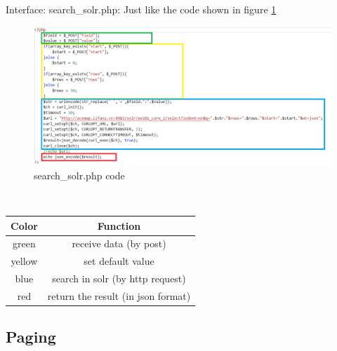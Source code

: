 \documentclass{article}
\begin{document}
	Interface: search\_solr.php: Just like the code shown in figure \ref{searchsolr}\\
	\begin{figure}[htb]
		\includegraphics[width=1.0\textwidth]{search_solr_php.png}
		\caption{search\_solr.php code}
		\label{searchsolr}
	\end{figure}\\
	\begin{tabular}{|c|c|}
		\hline
		\textbf{Color}&\textbf{Function}\\
		\hline
		\textcolor[rgb]{0,0.5,0.1}{green}&receive data (by post)\\
		\hline
		\textcolor[rgb]{0.9,0.7,0}{yellow}&set default value\\
		\hline
		\textcolor[rgb]{0,0,0.6}{blue}&search in solr (by http request)\\
		\hline
		\textcolor[rgb]{0.9,0,0}{red}&return the result (in json format)\\
		\hline
	\end{tabular}
	\subsection{Paging}
\end{document}

